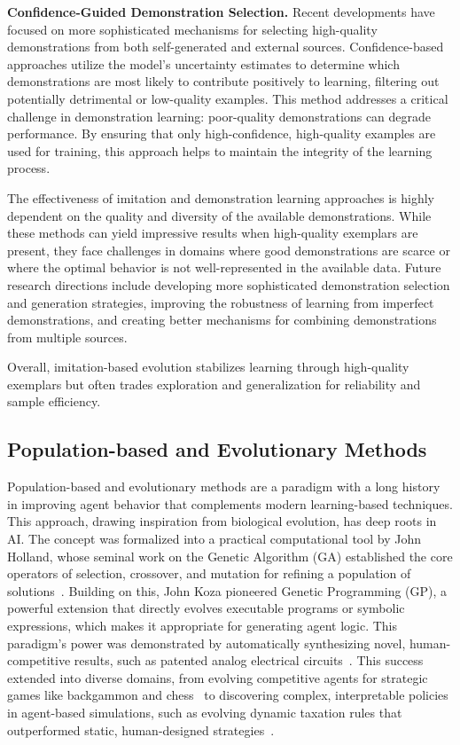 \textbf{Confidence-Guided Demonstration Selection.} 
Recent developments have focused on more sophisticated mechanisms for selecting high-quality demonstrations from both self-generated and external sources. Confidence-based approaches \citep{li2024confidence} utilize the model's uncertainty estimates to determine which demonstrations are most likely to contribute positively to learning, filtering out potentially detrimental or low-quality examples. This method addresses a critical challenge in demonstration learning: poor-quality demonstrations can degrade performance. By ensuring that only high-confidence, high-quality examples are used for training, this approach helps to maintain the integrity of the learning process.

The effectiveness of imitation and demonstration learning approaches is highly dependent on the quality and diversity of the available demonstrations. While these methods can yield impressive results when high-quality exemplars are present, they face challenges in domains where good demonstrations are scarce or where the optimal behavior is not well-represented in the available data. Future research directions include developing more sophisticated demonstration selection and generation strategies, improving the robustness of learning from imperfect demonstrations, and creating better mechanisms for combining demonstrations from multiple sources.



Overall, imitation-based evolution stabilizes learning through high-quality exemplars but often trades exploration and generalization for reliability and sample efficiency.


\subsection{Population-based and Evolutionary Methods}


Population-based and evolutionary methods are a paradigm with a long history in improving agent behavior that complements modern learning-based techniques. This approach, drawing inspiration from biological evolution, has deep roots in AI. The concept was formalized into a practical computational tool by John Holland, whose seminal work on the Genetic Algorithm (GA) established the core operators of selection, crossover, and mutation for refining a population of solutions~\citep{holland1976adaptation}. Building on this, John Koza pioneered Genetic Programming (GP), a powerful extension that directly evolves executable programs or symbolic expressions, which makes it appropriate for generating agent logic. This paradigm's power was demonstrated by automatically synthesizing novel, human-competitive results, such as patented analog electrical circuits~\citep{koza2010human}. This success extended into diverse domains, from evolving competitive agents for strategic games like backgammon and chess~\citep{hauptman2007evolution, azaria2005gpgammon} to discovering complex, interpretable policies in agent-based simulations, such as evolving dynamic taxation rules that outperformed static, human-designed strategies~\citep{garuccio2016genetic}.

